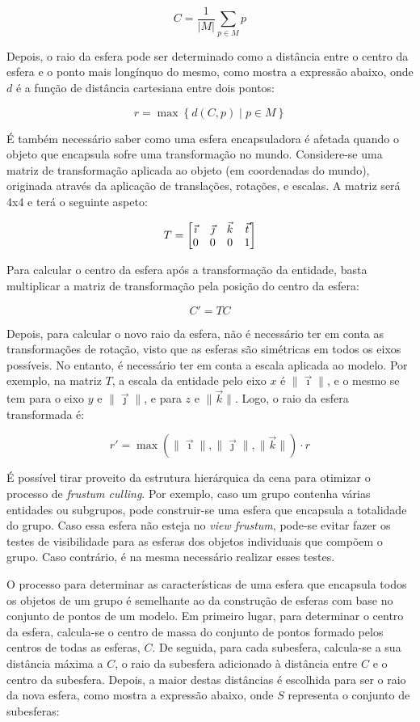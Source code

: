 \documentclass[12pt, a4paper]{article}
\begin{document}
$$
C = \frac{1}{|M|} \sum_{p \in M} p
$$

Depois, o raio da esfera pode ser determinado como a distância entre o centro da esfera e o ponto
mais longínquo do mesmo, como mostra a expressão abaixo, onde $d$ é a função de distância cartesiana
entre dois pontos:

$$
r = \max \left \lbrace d(C, p) \mid p \in M \right \rbrace
$$

É também necessário saber como uma esfera encapsuladora é afetada quando o objeto que encapsula
sofre uma transformação no mundo. Considere-se uma matriz de transformação aplicada ao objeto (em
coordenadas do mundo), originada através da aplicação de translações, rotações, e escalas. A matriz
será 4x4 e terá o seguinte aspeto:

$$
\bgroup
    T =
    \begin{bmatrix}
        \vec \imath & \vec \jmath & \vec k & \vec t \\
        0 & 0 & 0 & 1
    \end{bmatrix}
\egroup
$$

Para calcular o centro da esfera após a transformação da entidade, basta multiplicar a matriz de
transformação pela posição do centro da esfera:

$$
C' = T C
$$

Depois, para calcular o novo raio da esfera, não é necessário ter em conta as transformações de
rotação, visto que as esferas são simétricas em todos os eixos possíveis. No entanto, é necessário
ter em conta a escala aplicada ao modelo. Por exemplo, na matriz $T$, a escala da entidade pelo
eixo $x$ é $\lVert \vec \imath \rVert$, e o mesmo se tem para o eixo $y$ e
$\lVert \vec \jmath \rVert$, e para $z$ e $\lVert \vec k \rVert$. Logo, o raio da esfera
transformada é:

$$
r' =
    \max
        \left ( \lVert \vec \imath \rVert, \lVert \vec \jmath \rVert, \lVert \vec k \rVert \right )
    \cdot
        r
$$

É possível tirar proveito da estrutura hierárquica da cena para otimizar o processo de
\emph{frustum culling}. Por exemplo, caso um grupo contenha várias entidades ou subgrupos, pode
construir-se uma esfera que encapsula a totalidade do grupo. Caso essa esfera não esteja no
\emph{view frustum}, pode-se evitar fazer os testes de visibilidade para as esferas dos objetos
individuais que compõem o grupo. Caso contrário, é na mesma necessário realizar esses testes.

O processo para determinar as características de uma esfera que encapsula todos os objetos de um
grupo é semelhante ao da construção de esferas com base no conjunto de pontos de um modelo. Em
primeiro lugar, para determinar o centro da esfera, calcula-se o centro de massa do conjunto de
pontos formado pelos centros de todas as esferas, $C$. De seguida, para cada subesfera, calcula-se
a sua distância máxima a $C$, o raio da subesfera adicionado à distância entre $C$ e o centro da
subesfera. Depois, a maior destas distâncias é escolhida para ser o raio da nova esfera, como mostra
a expressão abaixo, onde $S$ representa o conjunto de subesferas:
\end{document}
